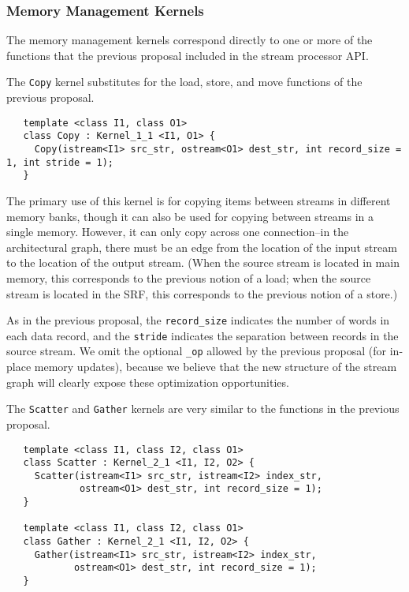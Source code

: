 \subsubsection*{Memory Management Kernels}

The memory management kernels correspond directly to one or more of
the functions that the previous proposal included in the stream
processor API.

 The {\tt Copy} kernel substitutes for the load, store, and move
functions of the previous proposal.
\begin{verbatim}
   template <class I1, class O1>
   class Copy : Kernel_1_1 <I1, O1> {
     Copy(istream<I1> src_str, ostream<O1> dest_str, int record_size = 1, int stride = 1);
   }  
\end{verbatim}

The primary use of this kernel is for copying items between streams in
different memory banks, though it can also be used for copying between
streams in a single memory.  However, it can only copy across one
connection--in the architectural graph, there must be an edge from the
location of the input stream to the location of the output stream.
(When the source stream is located in main memory, this corresponds to
the previous notion of a load; when the source stream is located in
the SRF, this corresponds to the previous notion of a store.)

As in the previous proposal, the {\tt record\_size} indicates the
number of words in each data record, and the {\tt stride} indicates
the separation between records in the source stream.  We omit the
optional {\tt \_op} allowed by the previous proposal (for in-place
memory updates), because we believe that the new structure of the
stream graph will clearly expose these optimization opportunities.

  The {\tt Scatter} and {\tt Gather} kernels are very similar to the
functions in the previous proposal.
\begin{verbatim}
   template <class I1, class I2, class O1>
   class Scatter : Kernel_2_1 <I1, I2, O2> {
     Scatter(istream<I1> src_str, istream<I2> index_str, 
             ostream<O1> dest_str, int record_size = 1);
   }

   template <class I1, class I2, class O1>
   class Gather : Kernel_2_1 <I1, I2, O2> {
     Gather(istream<I1> src_str, istream<I2> index_str, 
            ostream<O1> dest_str, int record_size = 1);
   }  
\end{verbatim}

